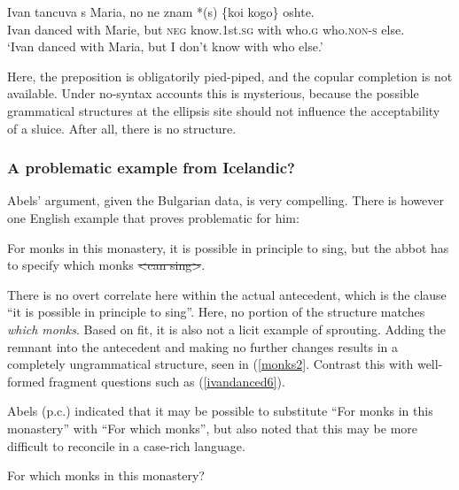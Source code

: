 \documentclass{turabian-researchpaper}
\begin{document}
\begin{exe}
\ex\label{ivanleft4}
\gll Ivan tancuva s Maria, no ne  znam *(s) \{koi \textbar kogo\} oshte. \\
Ivan danced  with Marie, but \textsc{neg} know.1st.\textsc{sg} with who.\textsc{g} who.\textsc{non-s} else. \\
\trans `Ivan danced with Maria, but I don't know with who else.'
\end{exe}


Here, the preposition is obligatorily pied-piped, and the copular completion is not available. Under no-syntax accounts this is mysterious, because the possible grammatical structures at the ellipsis site should not influence the acceptability of a sluice. After all, there is no structure. 

\subsubsection{A problematic example from Icelandic?}
Abels' argument, given the Bulgarian data, is very compelling. There is however one English example that proves problematic for him: 

\begin{exe}
\ex\label{monks1}
For monks in this monastery, it is possible in principle to sing, but the abbot has to specify which monks \sout{\textless can sing\textgreater}.
\end{exe}

There is no overt correlate here within the actual antecedent, which is the clause ``it is possible in principle to sing''. Here, no portion of the structure matches \textit{which monks}. Based on fit, it is also not a licit example of sprouting. Adding the remnant into the antecedent and making no further changes results in a completely ungrammatical structure, seen in (\ref{monks2}. Contrast this with well-formed fragment questions such as (\ref{ivandanced6}). 

\begin{exe}
\end{exe}

Abels (p.c.) indicated that it may be possible to substitute ``For monks in this monastery'' with ``For which monks'', but also noted that this may be more difficult to reconcile in a case-rich language. 

\begin{exe}
\ex\label{monks3}
For which monks in this monastery? 
\end{exe}
\end{document}
